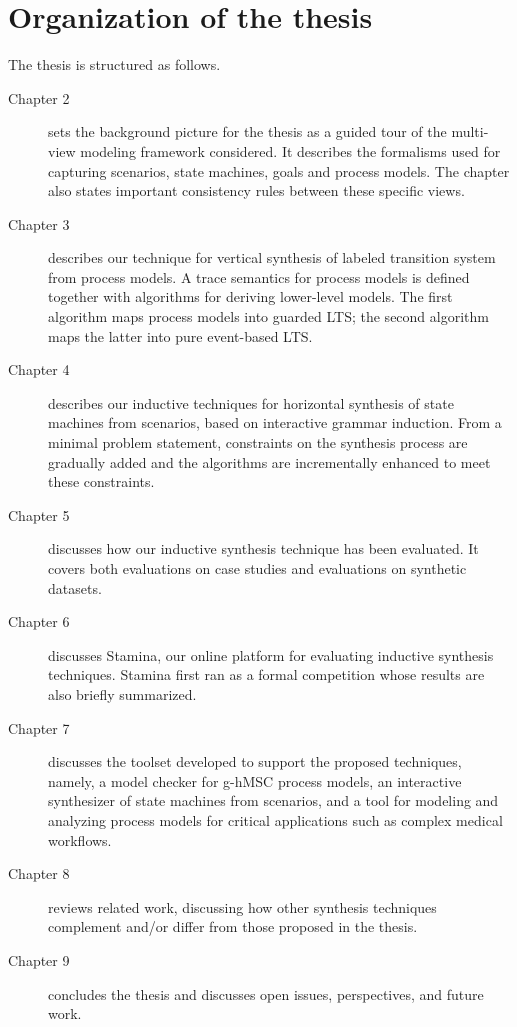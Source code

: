 \section{Organization of the thesis\label{section:intro-organization}}

The thesis is structured as follows.
\begin{description}

\item[Chapter 2] sets the background picture for the thesis as a guided tour of the multi-view modeling framework considered. It describes the formalisms used for capturing scenarios, state machines, goals and process models. The chapter also states important consistency rules between these specific views.

\item[Chapter 3] describes our technique for vertical synthesis of labeled transition system from process models. A trace semantics for process models is defined together with algorithms for deriving lower-level models. The first algorithm maps process models into guarded LTS; the second algorithm maps the latter into pure event-based LTS.

\item[Chapter 4] describes our inductive techniques for horizontal synthesis of state machines from scenarios, based on interactive grammar induction. From a minimal problem statement, constraints on the synthesis process are gradually added and the algorithms are incrementally enhanced to meet these constraints.

\item[Chapter 5] discusses how our inductive synthesis technique has been evaluated. It covers both evaluations on case studies and evaluations on synthetic datasets.

\item[Chapter 6] discusses Stamina, our online platform for evaluating inductive synthesis techniques. Stamina first ran as a formal competition whose results are also briefly summarized.

\item[Chapter 7] discusses the toolset developed to support the proposed techniques, namely, a model checker for g-hMSC process models, an interactive synthesizer of state machines from scenarios, and a tool for modeling and analyzing process models for critical applications such as complex medical workflows.

\item[Chapter 8] reviews related work, discussing how other synthesis techniques complement and/or differ from those proposed in the thesis.

\item[Chapter 9] concludes the thesis and discusses open issues, perspectives, and future work. 

\end{description}
